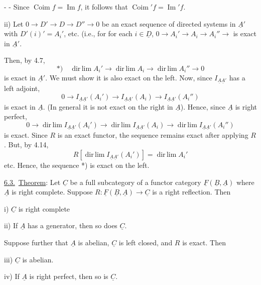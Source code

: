 -  -
Since $\operatorname{Coim}f=\operatorname{Im}f$, it follows that $\operatorname{Coim}'f=\operatorname{Im}'f$.

ii) Let $0\longrightarrow D'\longrightarrow D\longrightarrow D''\longrightarrow0$ be an exact sequence of directed systems in $\underline A'$ with $D'(i)'=A_i'$, etc.
(i.e., for for each $i\in\underline D$, $0\longrightarrow A_i'\longrightarrow A_i\longrightarrow A_i''\longrightarrow$ is exact in $\underline A'$.

Then, by 4.7,
\[
*)\quad\operatorname{dir\,lim}A_i'\longrightarrow\operatorname{dir\,lim}A_i
\longrightarrow\operatorname{dir\,lim}A_i''\longrightarrow0
\]
is exact in $\underline A'$. We must show it is also exact on the left. Now, since $I_{\underline A\underline A'}$ has a left adjoint,
\[
0\longrightarrow I_{\underline A\underline A'}(A_i')
\longrightarrow I_{\underline A\underline A'}(A_i)
\longrightarrow I_{\underline A\underline A'}(A_i'')
\]
is exact in $\underline A$. (In general it is not exact on the right in $\underline A$).
Hence, since $\underline A$ is right perfect,
\[
0\longrightarrow\operatorname{dir\,lim}I_{\underline A\underline A'}(A_i')
\longrightarrow\operatorname{dir\,lim}I_{\underline A\underline A'}(A_i)
\longrightarrow\operatorname{dir\,lim}I_{\underline A\underline A'}(A_i'')
\]
is exact. Since $R$ is an exact functor, the sequence remains exact after applying $R$. But, by 4.14,
\[
R[\operatorname{dir\,lim}I_{\underline A\underline A'}(A_i')]
=\operatorname{dir\,lim}A_i'
\]
etc. Hence, the sequence *) is exact on the left.

\uline{6.3.}\ \uline{Theorem}: Let $\underline C$ be a full subcategory of a functor category $\underline F(\underline B,\underline A)$ where $\underline A$ is right complete. Suppose $R:\underline F(\underline B,\underline A)\longrightarrow\underline C$ is a right reflection. Then

i) $\underline C$ is right complete

ii) If $\underline A$ has a generator, then so does $\underline C$.

Suppose further that $\underline A$ is abelian, $\underline C$ is left closed, and $R$ is exact. Then

iii) $\underline C$ is abelian.

iv) If $\underline A$ is right perfect, then so is $\underline C$.
